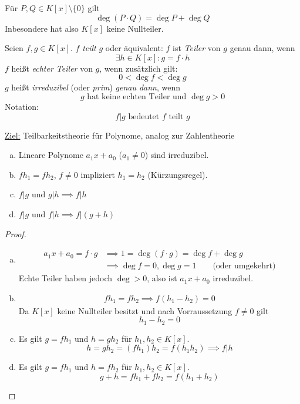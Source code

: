 \documentclass[a4paper, 10pt]{scrbook}
\begin{document}
\begin{lem}
\label{10.11}
Für $P,Q\in K[x]\setminus\{0\}$ gilt
\[
\deg (P\cdot Q) = \deg P+\deg Q
\]
Inbesondere hat also $K[x]$ keine Nullteiler.
\end{lem}

\begin{df}
\label{10.12}
Seien $f,g\in K[x]$.
$f$ \emph{teilt} $g$ oder äquivalent: $f$ ist \emph{Teiler} von $g$ genau dann, wenn
\[
\exists h\in K[x]: g=f\cdot h
\]
$f$ heißt \emph{echter Teiler} von $g$, wenn zusätzlich gilt:
\[
0 < \deg f < \deg g
\]
$g$ heißt \emph{irreduzibel} (oder \emph{prim}) \emph{genau dann}, wenn
\[
\text{$g$ hat keine echten Teiler und $\deg g > 0$}
\]
Notation:
\[
f|g \text{ bedeutet } f \text{ teilt } g
\]
\end{df}

\underline{Ziel:} Teilbarkeitstheorie für Polynome, analog zur Zahlentheorie

\begin{lem}
\label{lem:10.13}
\begin{enumerate}[(a)]
\item
Lineare Polynome $a_1x+a_0$ ($a_1\neq 0$) sind irreduzibel.
\item
$fh_1=fh_2$, $f\neq 0$ impliziert $h_1=h_2$ (Kürzungsregel).
\item
$f|g$ und $g|h \implies f|h$
\item
$f|g$ und $f|h \implies f|(g+h)$
\end{enumerate}
\begin{proof}
\begin{enumerate}[(a)]
\item
\begin{align*}
a_1x+a_0=f\cdot g &\implies 1=\deg(f\cdot g) =\deg f + \deg g\\
&\implies \deg f = 0, \deg g=1 \qquad \text{(oder umgekehrt)}
\end{align*}
	Echte Teiler haben jedoch $\deg > 0$, also ist $a_1x + a_0$ irreduzibel.
\item
\begin{align*}
fh_1=fh_2 \implies f(h_1-h_2)=0
\end{align*}
Da $K[x]$ keine Nullteiler besitzt und nach Vorraussetzung $f\neq 0$ gilt
\[
h_1-h_2=0
\]
\item
Es gilt $g=fh_1$ und $h=gh_2$ für $h_1,h_2\in K[x]$.
\[
h=gh_2=(fh_1)h_2=f(h_1h_2)\implies f|h
\]
\item
Es gilt $g=fh_1$ und $h=fh_2$ für $h_1,h_2\in K[x]$.
\[
g+h=fh_1+fh_2=f(h_1+h_2)
\]
\end{enumerate}
\end{proof}
\end{lem}
\end{document}
